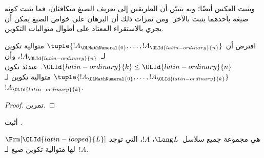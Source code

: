 \documentclass[../../../include/open-logic-section]{subfiles}
\begin{document}
ويثبت العكس أيضًا؛ وبه يتبيّن أن الطريقين إلى تعريف الصيغ
متكافئان، فما يثبت كونه صيغة بأحدهما يثبت بالآخر. ومن ثمرات ذلك
أن البرهان على خواص الصيغ يمكن أن يجري بالاستقراء المعتاد على
أطوال متواليات التكوين.

\begin{lem}
افترض أن $\tuple{!A_\OLMathNumeral{0},\dotsc,!A_\OLId{latin-ordinary}{n}}$ متوالية تكوين لـ~$!A_\OLId{latin-ordinary}{n}$، وأن
$\OLId{latin-ordinary}{k} \leq \OLId{latin-ordinary}{n}$. عندئذ تكون $\tuple{!A_\OLMathNumeral{0},\dotsc,!A_\OLId{latin-ordinary}{k}}$ متوالية تكوين
لـ~$!A_\OLId{latin-ordinary}{k}$.
\end{lem}

\begin{proof}
تمرين.
\end{proof}

\begin{prob}
أثبت .
\end{prob}

\begin{thm}
$\Frm[\OLId{latin-looped}{L}]$ هي مجموعة جميع سلاسل~$\Lang L$، $!A$، التي توجد لها
متوالية تكوين صيغ لـ~$!A$.
\end{thm}
\end{document}
